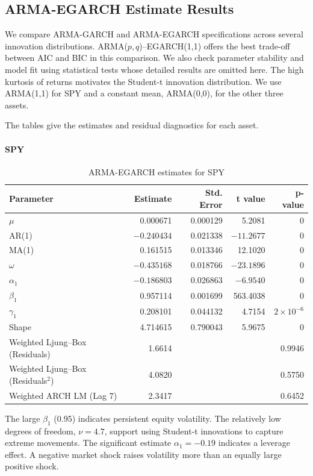 \documentclass[12pt,a4paper]{article}
\begin{document}
\subsection{ARMA-EGARCH Estimate Results}

We compare ARMA-GARCH and ARMA-EGARCH specifications across several innovation distributions. ARMA($p,q$)--EGARCH(1,1) offers the best trade-off between AIC and BIC in this comparison. We also check parameter stability and model fit using statistical tests whose detailed results are omitted here. The high kurtosis of returns motivates the Student-t innovation distribution.
We use ARMA(1,1) for SPY and a constant mean, ARMA(0,0), for the other three assets.

The tables give the estimates and residual diagnostics for each asset.

\paragraph{SPY}
\begin{table}[H]
\centering
\begin{tabular}{lrrrr}
\toprule
Parameter & Estimate & Std. Error & t value & p-value \\
\midrule
$\mu$ & 0.000671 & 0.000129 & 5.2081 & 0 \\
AR(1) & $-0.240434$ & 0.021338 & $-11.2677$ & 0 \\
MA(1) & 0.161515 & 0.013346 & 12.1020 & 0 \\
$\omega$ & $-0.435168$ & 0.018766 & $-23.1896$ & 0 \\
$\alpha_1$ & $-0.186803$ & 0.026863 & $-6.9540$ & 0 \\
$\beta_1$ & 0.957114 & 0.001699 & 563.4038 & 0 \\
$\gamma_1$ & 0.208101 & 0.044132 & 4.7154 & $2\times10^{-6}$ \\
Shape & 4.714615 & 0.790043 & 5.9675 & 0 \\
\midrule
Weighted Ljung--Box (Residuals) & 1.6614 & & & 0.9946 \\
Weighted Ljung--Box (Residuals$^2$) & 4.0820 & & & 0.5750 \\
Weighted ARCH LM (Lag 7) & 2.3417 & & & 0.6452 \\
\bottomrule
\end{tabular}
\caption{ARMA-EGARCH estimates for SPY}
\end{table}
The large $\beta_1$ (0.95) indicates persistent equity volatility. The relatively low degrees of freedom, $\nu=4.7$, support using Student-t innovations to capture extreme movements.
The significant estimate $\alpha_1=-0.19$ indicates a leverage effect. A negative market shock raises volatility more than an equally large positive shock.
\end{document}
